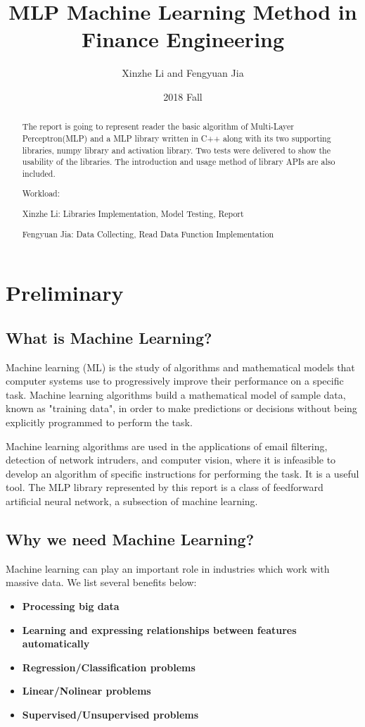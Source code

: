 \documentclass[letterpaper]{article}
\title{MLP Machine Learning Method in Finance Engineering}
\author{Xinzhe Li and Fengyuan Jia}
\date{2018 Fall}
\begin{document}
\maketitle

\begin{abstract}
The report is going to represent reader the basic algorithm of Multi-Layer Perceptron(MLP) and a MLP library written in C++ along with its two supporting libraries, numpy library and activation library. Two tests were delivered to show the usability of the libraries. The introduction and usage method of library APIs are also included. 

Workload:

Xinzhe Li:   Libraries Implementation, Model Testing, Report

Fengyuan Jia:   Data Collecting, Read Data Function Implementation  
\end{abstract}

\section{Preliminary}
\label{sec:introduction}
\subsection{What is Machine Learning?}
Machine learning (ML) is the study of algorithms and mathematical models that computer systems use to progressively improve their performance on a specific task. Machine learning algorithms build a mathematical model of sample data, known as "training data", in order to make predictions or decisions without being explicitly programmed to perform the task.\cite{nano3}

Machine learning algorithms are used in the applications of email filtering, detection of network intruders, and computer vision, where it is infeasible to develop an algorithm of specific instructions for performing the task. It is a useful tool. The MLP library represented by this report is a class of feedforward artificial neural network, a subsection of machine learning. 
\subsection{Why we need Machine Learning?}

Machine learning can play an important role in industries which work with massive data. We list several benefits below:

\begin{itemize}
	\item{\textbf{Processing big data}}
    \item{\textbf{Learning and expressing relationships between features automatically} }
    \item{\textbf{Regression/Classification problems} }
    \item{\textbf{Linear/Nolinear problems} }
    \item{\textbf{Supervised/Unsupervised problems} }
\end{itemize}
\end{document}
